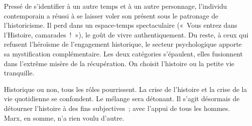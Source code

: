 \documentclass[french,twoside]{book} %
\begin{document}
Pressé de s’identifier à un autre temps et à un autre personnage, l’individu contemporain a réussi à se laisser voler son présent sous le patronage de l’historicisme. Il perd dans un espace-temps spectaculaire (« Vous entrez dans l’Histoire, camarades ! »), le goût de vivre authentiquement. Du reste, à ceux qui refusent l’héroïsme de l’engagement historique, le secteur psychologique apporte sa mystification complémentaire. Les deux catégories s’épaulent, elles fusionnent dans l’extrême misère de la récupération. On choisit l’histoire ou la petite vie tranquille.\par
Historique ou non, tous les rôles pourrissent. La crise de l’histoire et la crise de la vie quotidienne se confondent. Le mélange sera détonant. Il s’agit désormais de détourner l’histoire à des fins subjectives ; avec l’appui de tous les hommes. Marx, en somme, n’a rien voulu d’autre.
\end{document}
